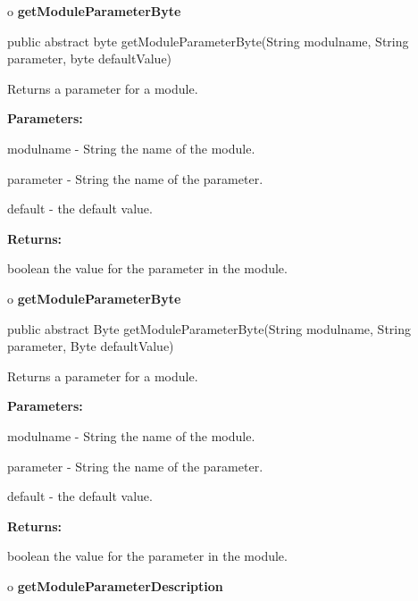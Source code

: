 o {\bf getModuleParameterByte} 

\begin{PRE}
 public abstract byte getModuleParameterByte(String modulname,
                                             String parameter,
                                             byte defaultValue)
\end{PRE}

\begin{description}
\htmlDD Returns a parameter for a module. 

\begin{description}
\item {\bf Parameters:}  

modulname - String the name of the module.  

parameter - String the name of the parameter.  

default - the default value.  
\item {\bf Returns:}  

boolean the value for the parameter in the module.  
\end{description}

\end{description}

o {\bf getModuleParameterByte} 

\begin{PRE}
 public abstract Byte getModuleParameterByte(String modulname,
                                             String parameter,
                                             Byte defaultValue)
\end{PRE}

\begin{description}
\htmlDD Returns a parameter for a module. 

\begin{description}
\item {\bf Parameters:}  

modulname - String the name of the module.  

parameter - String the name of the parameter.  

default - the default value.  
\item {\bf Returns:}  

boolean the value for the parameter in the module.  
\end{description}

\end{description}

o {\bf getModuleParameterDescription} 


